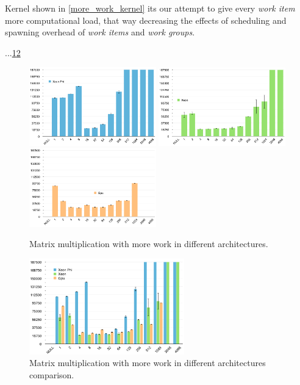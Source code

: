 \par{Kernel shown in \ref{more_work_kernel} its our attempt to give every \emph{work item} more computational load, that way decreasing the
    effects of scheduling and spawning overhead of \emph{work items} and \emph{work groups}.}
\par{...\ref{MoreWork}\ref{MoreWorkComp}}



\begin{figure}[!h]
    \centering
    \includegraphics[width=0.49\textwidth]{figures/opt1_phi.png}
    \includegraphics[width=0.49\textwidth]{figures/opt1_cpu.png}
    \includegraphics[width=0.49\textwidth]{figures/opt1_gpu.png}
    \caption{Matrix multiplication with more work in different architectures.}
    \label{MoreWork}
\end{figure}

\begin{figure}[!h]
    \centering
    \includegraphics[width=0.6\textwidth]{figures/opt1_comp.png}
    \caption{Matrix multiplication with more work in different architectures comparison.}
    \label{MoreWorkComp}
\end{figure}

